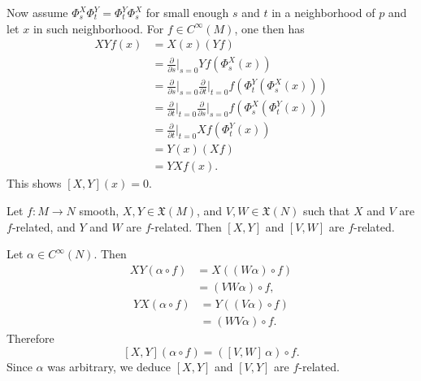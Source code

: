 \documentclass{ximera}
\begin{document}
\begin{proposition}
\begin{solution}
        
        Now assume $\Phi _s ^X \Phi_t ^Y = \Phi _t^Y \Phi _s ^X$ for small enough $s$ and $t$ in a neighborhood of $p$ and let $x$ in such neighborhood. For $f \in C^{\infty}(M)$, one then has
        \begin{align*}
            XY f(x) & = X(x) (Yf) \\
            & = \frac{\partial}{\partial s} \Big\vert _{s = 0} Yf ( \Phi ^X_s (x) ) \\
            & = \frac{\partial}{\partial s} \Big\vert _{s = 0} \frac{\partial}{\partial t} \Big\vert _{t = 0}  f  ( \Phi ^Y _t (\Phi ^X _s (x) )  ) \\
            & = \frac{\partial}{\partial t} \Big\vert _{t = 0} \frac{\partial}{\partial s} \Big\vert _{s = 0}   f  ( \Phi ^X _s (\Phi ^Y _t (x) )  ) \\
            & = \frac{\partial}{\partial t} \Big\vert _{t = 0} Xf ( \Phi ^Y_t (x) ) \\
            & = Y(x) (Xf) \\
            & = YX f (x). 
        \end{align*}
        This shows $[X,Y](x) = 0$. 
    \end{solution}
    \end{proposition}


    \begin{proposition}
        Let $f: M \to N$ smooth, $X, Y \in \mathfrak{X}(M)$, and $V, W \in \mathfrak{X}(N)$ such that $X$ and $V$ are $f$-related, and $Y$ and $W$ are $f$-related. Then $[X, Y]$ and $[V, W]$ are $f$-related.

    \begin{solution}
        Let $\alpha \in C^{\infty}(N)$. Then
        \begin{align*}
            XY ( \alpha \circ f ) & = X ( ( W \alpha ) \circ f  ) \\
            & = ( VW \alpha ) \circ f ,
        \end{align*}
        \begin{align*}
            YX ( \alpha \circ f ) & = Y ( ( V \alpha ) \circ f  ) \\
            & = ( WV \alpha ) \circ f .
        \end{align*}
        Therefore
        \[   [X,Y] (\alpha \circ f)  = ( [V,W] \, \alpha  ) \circ f  .  \]
        Since $\alpha $ was arbitrary, we deduce $[X,Y]$ and $[V,Y]$ are $f$-related. 
    \end{solution}
    \end{proposition}

    
\end{document}
